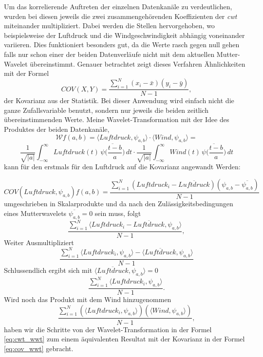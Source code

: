 \begin{refsection}
Um das korrelierende Auftreten der einzelnen Datenkanäle zu verdeutlichen, wurden bei diesen jeweils die zwei zusammengehörenden Koeffizienten der \textit{cwt} miteinander multipliziert. 
Dabei werden die Stellen hervorgehoben, wo beispielsweise der Luftdruck und die Windgeschwindigkeit abhängig voneinander variieren.  
Dies funktioniert besonders gut, da die Werte rasch gegen null gehen falls nur schon einer der beiden Datenverläufe nicht mit dem aktuellen Mutter-Wavelet übereinstimmt.
Genauer betrachtet zeigt dieses Verfahren Ähnlichkeiten mit der Formel
\begin{equation}
COV(X,Y) = \frac{\sum_{i=1}^{N} (x_i- \bar{x})(y_i- \bar{y})}{N-1},
\end{equation}
der Kovarianz aus der Statistik. Bei dieser Anwendung wird einfach nicht die ganze Zufallsvariable benutzt, sondern nur jeweils die beiden zeitlich übereinstimmenden Werte.
Meine Wavelet-Transformation mit der Idee des Produktes der beiden Datenkanäle,
\begin{equation}
\mathcal{W}f (a,b)
=
\langle Luftdruck,\psi_{a,b}\rangle\cdot\langle Wind,\psi_{a,b}\rangle
=
\end{equation}
\begin{equation}
\frac{1}{\sqrt{|a|}}\int_{-\infty}^\infty Luftdruck(t)\,\overline{
	\psi\biggl(\frac{t-b}{a}\biggr)}\,dt
\cdot
\frac{1}{\sqrt{|a|}}\int_{-\infty}^\infty Wind(t)\,\overline{
	\psi\biggl(\frac{t-b}{a}\biggr)}\,dt
\label{eq:cwt_wwt}
\end{equation}
kann für den erstmals für den Luftdruck auf die Kovarianz angewandt Werden:

\begin{equation}
COV(Luftdruck, \psi_{a,b})f(a,b) = \frac{\sum_{i=1}^{N} (Luftdruck_i - \overline{Luftdruck})(\psi_{a,b}-  \overline{\psi_{a,b}})}{N-1}
\end{equation}
umgeschrieben in Skalarprodukte und da nach den Zulässigkeitsbedingungen eines Mutterwavelets $\overline{\psi_{a,b}} = 0$ sein muss, folgt 
\begin{equation}
 \frac{\sum_{i=1}^{N} 
 \langle Luftdruck_i- \overline{Luftdruck},\psi_{a,b}\rangle}{N-1},
\end{equation}
Weiter Ausmultipliziert
\begin{equation}
\frac{\sum_{i=1}^{N} 
\langle Luftdruck_i,\psi_{a,b}\rangle - \langle \overline{Luftdruck},\psi_{a,b}\rangle}{N-1}
\end{equation}
Schlussendlich ergibt sich mit $\langle \overline{Luftdruck},\psi_{a,b} \rangle = 0$
\begin{equation}
\frac{\sum_{i=1}^{N} 
	\langle Luftdruck_i,\psi_{a,b}\rangle}{N-1}.
\end{equation}
 Wird noch das Produkt mit dem Wind hinzugenommen
 \begin{equation}
 \frac{\sum_{i=1}^{N} 
 	(\langle Luftdruck_i,\psi_{a,b}\rangle)(\langle Wind,\psi_{a,b}\rangle)}{N-1},
 \label{eq:cov_wwt}
 \end{equation}
 haben wir die Schritte von der Wavelet-Transformation in der Formel \ref{eq:cwt_wwt} zum einem äquivalenten Resultat mit der Kovarianz in der Formel \ref{eq:cov_wwt} gebracht.



\end{refsection}
